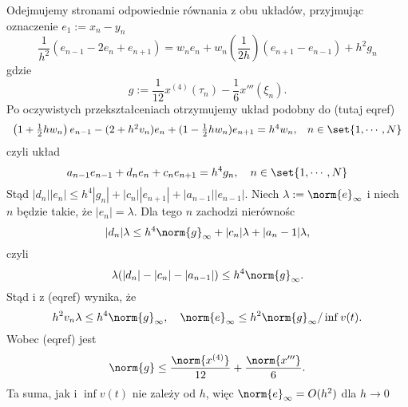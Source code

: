 Odejmujemy stronami odpowiednie równania z obu układów, przyjmując oznaczenie $e_1:=x_n - y_n$
\begin{equation}
\frac{1}{h^2}(e_{n-1} - 2e_n + e_{n+1}) = w_ne_n + w_n(\frac{1}{2h})(e_{n+1} - e_{n-1})+ h^2g_n
\end{equation}
gdzie 
\begin{equation}
g:= \frac{1}{12} x^{(4)}(\tau_n) - \frac{1}{6} x'''(\xi_n).
\end{equation}
Po oczywistych przekształceniach otrzymujemy układ podobny do (tutaj eqref)
$$
\begin{array}{cl}
\left(1+ \frac{1}{2}hw_n\right)e_{n-1} - (2+ h^2v_n)e_n + (1- \frac{1}{2}hw_n)e_{n+1} = h^4w_n ,& n \in \set{1,\cdots,N}
\end{array}
$$
czyli układ
$$
a_{n-1}e_{n-1} + d_ne_n + c_ne_{n+1} = h^4g_n, \quad n \in \set{1,\cdots,N}
$$
Stąd $|d_n||e_n| \leq h^4|g_n| + |c_n||e_{n+1}| + |a_{n-1}||e_{n-1}|$. Niech $\lambda := {\norm{e}}_\infty$ i niech $n$ będzie takie, że $|e_n| = \lambda$. Dla tego $n$ zachodzi nierównośc
$$
|d_n|\lambda \leq h^4 {\norm{g}}_\infty + |c_n|\lambda + |a_n -1|\lambda,
$$
czyli 
$$
\lambda(|d_n|-|c_n|-|a_{n-1}|) \leq h^4 {\norm{g}}_\infty.
$$
Stąd i z (eqref) wynika, że 
$$
h^2 v_n \lambda \leq h^4  {\norm{g}}_\infty, \quad {\norm{e}}_\infty \leq h^2 {\norm{g}}_\infty / \inf v(t).
$$
Wobec (eqref) jest
$$
\norm{g} \leq \frac{\norm{x^{(4)}}}{12}+\frac{\norm{x'''}}{6}.
$$
Ta suma, jak i $\inf v(t)$ nie zależy od $h$, więc ${\norm{e}}_\infty = O(h^2)$ dla $h \to 0$ 